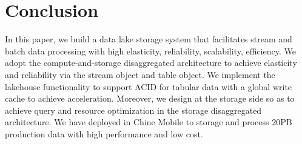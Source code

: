 \section{Conclusion} 
\label{sec:con}

In this paper, we build a data lake storage system \sys that facilitates stream and batch data processing with high elasticity, reliability, scalability, efficiency. We adopt the compute-and-storage disaggregated architecture to achieve  elasticity and reliability via the stream object and table object. We implement the lakehouse functionality to support ACID for tabular data with a global write cache to achieve acceleration.  Moreover, we design \brain at the storage side so as to achieve query and resource optimization in the storage  disaggregated architecture. We have deployed \sys in Chine Mobile to storage and process 20PB production data with high performance and low cost.
